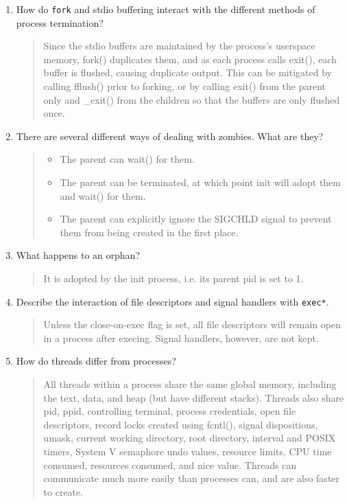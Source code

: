 \documentclass[letterpaper,10pt,onecolumn,titlepage]{article}
\begin{document}
\begin{enumerate}
\item How do \texttt{fork} and stdio buffering interact with the different methods of process termination?
\begin{quote}
Since the stdio buffers are maintained by the process's userspace memory, fork() duplicates them, and as each process calls exit(), each buffer is flushed, causing duplicate output.  This can be mitigated by calling fflush() prior to forking, or by calling exit() from the parent only and \_exit() from the children so that the buffers are only flushed once.
\end{quote}

\item There are several different ways of dealing with zombies. What are they?
\begin{quote}
\begin{itemize}
\item The parent can wait() for them.
\item The parent can be terminated, at which point init will adopt them and wait() for them.
\item The parent can explicitly ignore the SIGCHLD signal to prevent them from being created in the first place.
\end{itemize}
\end{quote}

\item What happens to an orphan?
\begin{quote}
It is adopted by the init process, i.e. its parent pid is set to 1.
\end{quote}

\item Describe the interaction of file descriptors and signal handlers with \texttt{exec*}.
\begin{quote}
Unless the close-on-exec flag is set, all file descriptors will remain open in a process after execing.  Signal handlers, however, are not kept.
\end{quote}

\item How do threads differ from processes?
\begin{quote}
All threads within a process share the same global memory, including the text, data, and heap (but have different stacks).  Threads also share pid, ppid, controlling terminal, process credentials, open file descriptors, record locks created using fcntl(), signal dispositions, umask, current working directory, root directory, interval and POSIX timers, System V semaphore undo values, resource limits, CPU time consumed, resources consumed, and nice value.  Threads can communicate much more easily than processes can, and are also faster to create.
\end{quote}


\end{enumerate}
\end{document}
